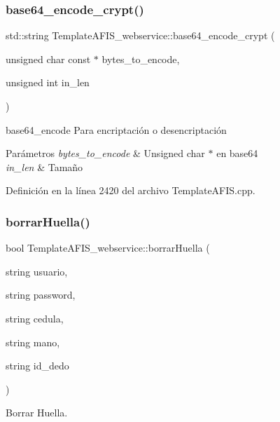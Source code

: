 \subsubsection{\texorpdfstring{base64\+\_\+encode\+\_\+crypt()}{base64\_encode\_crypt()}}
{\footnotesize\ttfamily std\+::string Template\+A\+F\+I\+S\+\_\+webservice\+::base64\+\_\+encode\+\_\+crypt (\begin{DoxyParamCaption}\item[{unsigned char const $\ast$}]{bytes\+\_\+to\+\_\+encode,  }\item[{unsigned int}]{in\+\_\+len }\end{DoxyParamCaption})}



base64\+\_\+encode Para encriptación o desencriptación 


\begin{DoxyParams}{Parámetros}
{\em bytes\+\_\+to\+\_\+encode} & Unsigned char $\ast$ en base64 \\
\hline
{\em in\+\_\+len} & Tamaño \\
\hline
\end{DoxyParams}


Definición en la línea 2420 del archivo Template\+A\+F\+I\+S.\+cpp.

\hypertarget{classTemplateAFIS__webservice_ac3575e5ecd80a7847c2ecda152778e38}{}\label{classTemplateAFIS__webservice_ac3575e5ecd80a7847c2ecda152778e38} 
\subsubsection{\texorpdfstring{borrar\+Huella()}{borrarHuella()}}
{\footnotesize\ttfamily bool Template\+A\+F\+I\+S\+\_\+webservice\+::borrar\+Huella (\begin{DoxyParamCaption}\item[{string}]{usuario,  }\item[{string}]{password,  }\item[{string}]{cedula,  }\item[{string}]{mano,  }\item[{string}]{id\+\_\+dedo }\end{DoxyParamCaption})}



Borrar Huella. 



